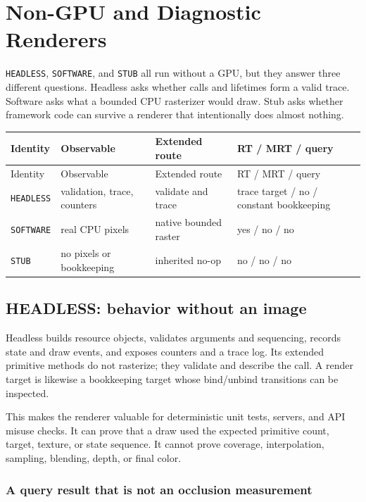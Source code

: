 \chapter{Non-GPU and Diagnostic Renderers}
\label{ch:diagnostic-renderers}

\texttt{HEADLESS}, \texttt{SOFTWARE}, and \texttt{STUB} all run without a GPU, but they answer
three different questions.  Headless asks whether calls and lifetimes form a valid trace.
Software asks what a bounded CPU rasterizer would draw.  Stub asks whether framework code can
survive a renderer that intentionally does almost nothing.

\begin{longtable}{p{}p{}p{}p{}}
\toprule
Identity & Observable & Extended route & RT / MRT / query \\
\midrule
\endfirsthead
\toprule
Identity & Observable & Extended route & RT / MRT / query \\
\midrule
\endhead
\texttt{HEADLESS} & validation, trace, counters & validate and trace & trace target / no / constant bookkeeping \\
\texttt{SOFTWARE} & real CPU pixels & native bounded raster & yes / no / no \\
\texttt{STUB} & no pixels or bookkeeping & inherited no-op & no / no / no \\
\bottomrule
\end{longtable}

\section{HEADLESS: behavior without an image}

Headless builds resource objects, validates arguments and sequencing, records state and draw
events, and exposes counters and a trace log.  Its extended primitive methods do not rasterize;
they validate and describe the call.  A render target is likewise a bookkeeping target whose
bind/unbind transitions can be inspected.

This makes the renderer valuable for deterministic unit tests, servers, and API misuse checks.
It can prove that a draw used the expected primitive count, target, texture, or state sequence.
It cannot prove coverage, interpolation, sampling, blending, depth, or final color.

\subsection{A query result that is not an occlusion measurement}

